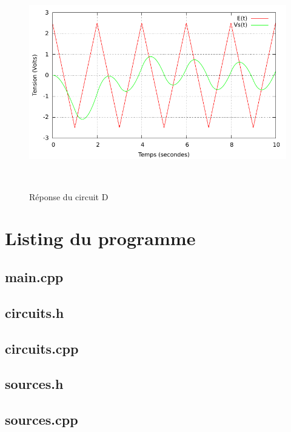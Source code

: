 \documentclass[a4paper,11pt]{article}
\begin{document}
\begin{figure}[h!]
\begin{minipage}[b]{0.5\linewidth}
   \end{minipage}
  \begin{minipage}[b]{0.5\linewidth}   
      \centering \includegraphics[scale=.68]{CDtriangle.pdf}
   \end{minipage}\\
 \caption{Réponse du circuit D}
\end{figure}




  \newpage
  \appendix
  \section{Listing du programme}
  \subsection{main.cpp}
    
    \newpage
  \subsection{circuits.h}
    
    \newpage
  \subsection{circuits.cpp}
    
    \newpage
   \subsection{sources.h}
    
    \newpage
   \subsection{sources.cpp}
    
    \newpage
\end{document}

